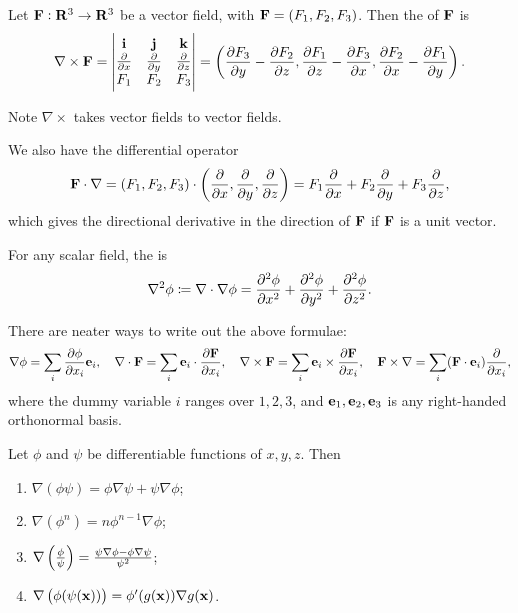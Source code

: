 \begin{definition}[Curl]
Let $\vb{F}:\mathbf R^3\to\mathbf R^3$ be a vector field, with $\vb{F}=(F_1,F_2,F_3)$. Then the  of $\vb{F}$ is
\[\nabla\times\vb{F}=\begin{vmatrix}
\vb{i}&\vb{j}&\vb{k}\\
\pdv{}{x}&\pdv{}{y}&\pdv{}{z}\\
F_1&F_2&F_3
\end{vmatrix}=
\left(\pdv{F_3}{y}-\pdv{F_2}{z},\pdv{F_1}{z}-\pdv{F_3}{x},\pdv{F_2}{x}-\pdv{F_1}{y}\right).\]
\end{definition}

Note $\nabla\times$ takes vector fields to vector fields.

We also have the differential operator
\[\vb{F}\cdot\nabla=(F_1,F_2,F_3)\cdot\left(\pdv{}{x},\pdv{}{y},\pdv{}{z}\right)=F_1\pdv{}{x}+F_2\pdv{}{y}+F_3\pdv{}{z},\]
which gives the directional derivative in the direction of $\vb{F}$ if $\vb{F}$ is a unit vector.

\begin{definition}[Laplacian]
For any scalar field, the  is
\[\nabla^2\phi\coloneqq\nabla\cdot\nabla\phi=\pdv[2]{\phi}{x}+\pdv[2]{\phi}{y}+\pdv[2]{\phi}{z}.\]
\end{definition}

\begin{notation}
There are neater ways to write out the above formulae:
\[\nabla\phi=\sum_i\pdv{\phi}{x_i}\vb{e}_i,\quad\nabla\cdot\vb{F}=\sum_i\vb{e}_i\cdot\pdv{\vb{F}}{x_i},\quad\nabla\times\vb{F}=\sum_i\vb{e}_i\times\pdv{\vb{F}}{x_i},\quad\vb{F}\times\nabla=\sum_i(\vb{F}\cdot\vb{e}_i)\pdv{}{x_i},\]
where the dummy variable $i$ ranges over $1,2,3$, and $\vb{e}_1,\vb{e}_2,\vb{e}_3$ is any right-handed orthonormal basis.
\end{notation}

\begin{proposition}
Let $\phi$ and $\psi$ be differentiable functions of $x,y,z$. Then
\begin{enumerate}[label=(\roman*)]
\item $\nabla(\phi\psi)=\phi\nabla\psi+\psi\nabla\phi$;
\item $\nabla(\phi^n)=n\phi^{n-1}\nabla\phi$;
\item $\nabla\left(\frac{\phi}{\psi}\right)=\frac{\psi\nabla\phi-\phi\nabla\psi}{\psi^2}$;
\item $\nabla\left(\phi(\psi(\vb{x}))\right)=\phi^\prime(g(\vb{x}))\nabla g(\vb{x})$.
\end{enumerate}
\end{proposition}

